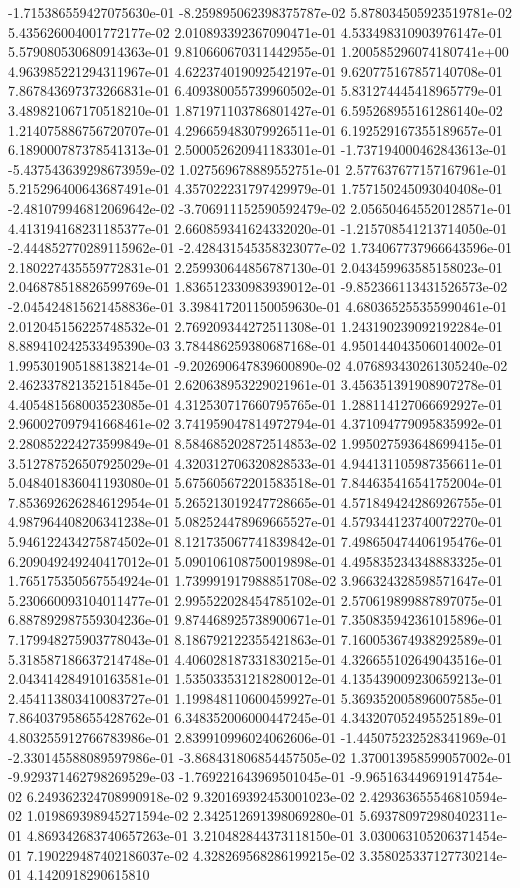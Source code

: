 -1.715386559427075630e-01	-8.259895062398375787e-02	5.878034505923519781e-02	5.435626004001772177e-02	2.010893392367090471e-01	4.533498310903976147e-01	5.579080530680914363e-01	9.810660670311442955e-01	1.200585296074180741e+00	4.963985221294311967e-01	4.622374019092542197e-01	9.620775167857140708e-01	7.867843697373266831e-01	6.409380055739960502e-01	5.831274445418965779e-01	3.489821067170518210e-01	1.871971103786801427e-01	6.595268955161286140e-02	1.214075886756720707e-01	4.296659483079926511e-01	6.192529167355189657e-01	6.189000787378541313e-01	2.500052620941183301e-01	-1.737194000462843613e-01	-5.437543639298673959e-02	1.027569678889552751e-01	2.577637677157167961e-01	5.215296400643687491e-01	4.357022231797429979e-01	1.757150245093040408e-01	-2.481079946812069642e-02	-3.706911152590592479e-02	2.056504645520128571e-01	4.413194168231185377e-01	2.660859341624332020e-01	-1.215708541213714050e-01	-2.444852770289115962e-01	-2.428431545358323077e-02	1.734067737966643596e-01	2.180227435559772831e-01	2.259930644856787130e-01	2.043459963585158023e-01	2.046878518826599769e-01	1.836512330983939012e-01	-9.852366113431526573e-02	-2.045424815621458836e-01	3.398417201150059630e-01	4.680365255355990461e-01	2.012045156225748532e-01	2.769209344272511308e-01	1.243190239092192284e-01	8.889410242533495390e-03	3.784486259380687168e-01	4.950144043506014002e-01	1.995301905188138214e-01	-9.202690647839600890e-02	4.076893430261305240e-02	2.462337821352151845e-01	2.620638953229021961e-01	3.456351391908907278e-01	4.405481568003523085e-01	4.312530717660795765e-01	1.288114127066692927e-01	2.960027097941668461e-02	3.741959047814972794e-01	4.371094779095835992e-01	2.280852224273599849e-01	8.584685202872514853e-02	1.995027593648699415e-01	3.512787526507925029e-01	4.320312706320828533e-01	4.944131105987356611e-01	5.048401836041193080e-01	5.675605672201583518e-01	7.844635416541752004e-01	7.853692626284612954e-01	5.265213019247728665e-01	4.571849424286926755e-01	4.987964408206341238e-01	5.082524478969665527e-01	4.579344123740072270e-01	5.946122434275874502e-01	8.121735067741839842e-01	7.498650474406195476e-01	6.209049249240417012e-01	5.090106108750019898e-01	4.495835234348883325e-01	1.765175350567554924e-01	1.739991917988851708e-02	3.966324328598571647e-01	5.230660093104011477e-01	2.995522028454785102e-01	2.570619899887897075e-01	6.887892987559304236e-01	9.874468925738900671e-01	7.350835942361015896e-01	7.179948275903778043e-01	8.186792122355421863e-01	7.160053674938292589e-01	5.318587186637214748e-01	4.406028187331830215e-01	4.326655102649043516e-01	2.043414284910163581e-01	1.535033531218280012e-01	4.135439009230659213e-01	2.454113803410083727e-01	1.199848110600459927e-01	5.369352005896007585e-01	7.864037958655428762e-01	6.348352006000447245e-01	4.343207052495525189e-01	4.803255912766783986e-01	2.839910996024062606e-01	-1.445075232528341969e-01	-2.330145588089597986e-01	-3.868431806854457505e-02	1.370013958599057002e-01	-9.929371462798269529e-03	-1.769221643969501045e-01	-9.965163449691914754e-02	6.249362324708990918e-02	9.320169392453001023e-02	2.429363655546810594e-02	1.019869398945271594e-02	2.342512691398069280e-01	5.693780972980402311e-01	4.869342683740657263e-01	3.210482844373118150e-01	3.030063105206371454e-01	7.190229487402186037e-02	4.328269568286199215e-02	3.358025337127730214e-01	4.1420918290615810